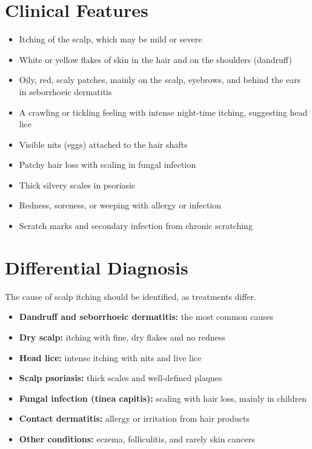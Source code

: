 \section*{Clinical Features}
\begin{itemize}
    \item Itching of the scalp, which may be mild or severe
    \item White or yellow flakes of skin in the hair and on the shoulders (dandruff)
    \item Oily, red, scaly patches, mainly on the scalp, eyebrows, and behind the ears in seborrhoeic dermatitis
    \item A crawling or tickling feeling with intense night-time itching, suggesting head lice
    \item Visible nits (eggs) attached to the hair shafts
    \item Patchy hair loss with scaling in fungal infection
    \item Thick silvery scales in psoriasis
    \item Redness, soreness, or weeping with allergy or infection
    \item Scratch marks and secondary infection from chronic scratching
\end{itemize}

\section*{Differential Diagnosis}
The cause of scalp itching should be identified, as treatments differ.
\begin{itemize}
    \item \textbf{Dandruff and seborrhoeic dermatitis:} the most common causes
    \item \textbf{Dry scalp:} itching with fine, dry flakes and no redness
    \item \textbf{Head lice:} intense itching with nits and live lice
    \item \textbf{Scalp psoriasis:} thick scales and well-defined plaques
    \item \textbf{Fungal infection (tinea capitis):} scaling with hair loss, mainly in children
    \item \textbf{Contact dermatitis:} allergy or irritation from hair products
    \item \textbf{Other conditions:} eczema, folliculitis, and rarely skin cancers
\end{itemize}

